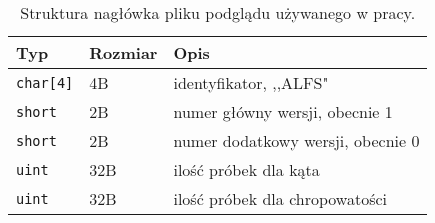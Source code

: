 \documentclass[../main.tex]{subfiles}
\begin{document}
\begin{table}[h]
    \centering
    \begin{tabular}{|l|l|l|}
        \hline
        Typ & Rozmiar & Opis \\ \hline
        \texttt{char[4]} & 4B & identyfikator, ,,ALFS" \\\hline
        \texttt{short} & 2B & numer główny wersji, obecnie 1 \\\hline
        \texttt{short} & 2B & numer dodatkowy wersji, obecnie 0 \\\hline
        \texttt{uint} & 32B & ilość próbek dla kąta \\\hline
        \texttt{uint} & 32B & ilość próbek dla chropowatości \\\hline
    \end{tabular}
    \caption{Struktura nagłówka pliku podglądu używanego w pracy.}
    \label{table:ALFHeader}
\end{table}
\end{document}
